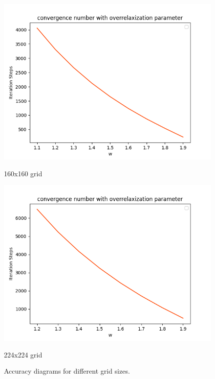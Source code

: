 \documentclass[12pt]{article}
\begin{document}
\begin{figure}[H]
    \vspace{1em} %

    \begin{minipage}{0.45\textwidth}
        \includegraphics[width=\linewidth]{0.1ws_for160grid.png}
        \caption{160x160 grid}
        \label{fig:160grid}
    \end{minipage}
    \hfill
    \begin{minipage}{0.45\textwidth}
        \includegraphics[width=\linewidth]{0.1wsfor224grid.png}
        \caption{224x224 grid}
        \label{fig:224grid}
    \end{minipage}

    \caption{Accuracy diagrams for different grid sizes.}
    \label{fig:grids}
\end{figure}
\end{document}
